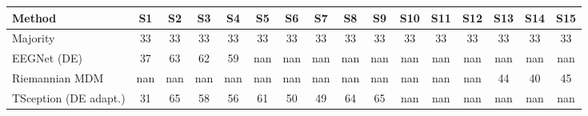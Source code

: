 \begin{tabular}{lccccccccccccccc}
\toprule
Method & S1 & S2 & S3 & S4 & S5 & S6 & S7 & S8 & S9 & S10 & S11 & S12 & S13 & S14 & S15 \\
\midrule
Majority & 33 & 33 & 33 & 33 & 33 & 33 & 33 & 33 & 33 & 33 & 33 & 33 & 33 & 33 & 33 \\
EEGNet (DE) & 37 & 63 & 62 & 59 & nan & nan & nan & nan & nan & nan & nan & nan & nan & nan & nan \\
Riemannian MDM & nan & nan & nan & nan & nan & nan & nan & nan & nan & nan & nan & nan & 44 & 40 & 45 \\
TSception (DE adapt.) & 31 & 65 & 58 & 56 & 61 & 50 & 49 & 64 & 65 & nan & nan & nan & nan & nan & nan \\
\bottomrule
\end{tabular}